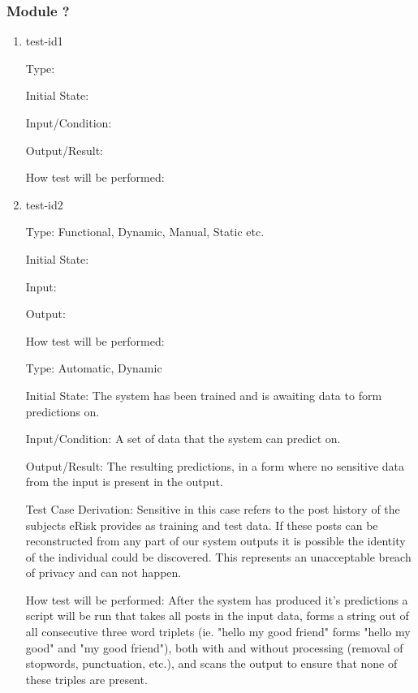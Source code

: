 \documentclass[12pt, titlepage]{article}
\begin{document}

\subsubsection{Module ?}
		
\begin{enumerate}

\item{test-id1\\}

Type: 
					
Initial State: 
					
Input/Condition: 
					
Output/Result: 
					
How test will be performed: 
					
\item{test-id2\\}

Type: Functional, Dynamic, Manual, Static etc.
					
Initial State: 
					
Input: 
					
Output: 
					
How test will be performed: 

Type: Automatic, Dynamic
					
Initial State: The system has been trained and is awaiting data to form predictions on.
					
Input/Condition: A set of data that the system can predict on.
					
Output/Result: The resulting predictions, in a form where no sensitive data from the input is present in the output.

Test Case Derivation: Sensitive in this case refers to the post history of the subjects eRisk provides as training and test data. If these posts can be reconstructed from any part of our system outputs it is possible the identity of the individual could be discovered. This represents an unacceptable breach of privacy and can not happen.
					
How test will be performed: After the system has produced it's predictions a script will be run that takes all posts in the input data, forms a string out of all consecutive three word triplets (ie. "hello my good friend" forms "hello my good" and "my good friend"), both with and without processing (removal of stopwords, punctuation, etc.), and scans the output to ensure that none of these triples are present.

\end{enumerate}
\end{document}

